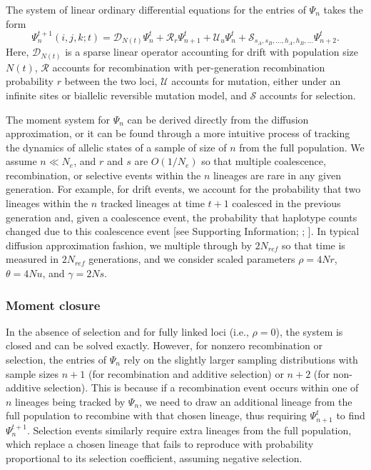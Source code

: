 \documentclass[]{article}
\begin{document}
The system of linear ordinary differential equations for the entries of
\(\Psi_n\) takes the form
\begin{equation}
\label{eq:system}
{\Psi}_n^{t+1}(i, j, k; t) =
\mathcal{D}_{N(t)}\Psi_n^t
+ \mathcal{R}_{r}\Psi_{n+1}^t
+ \mathcal{U}_{u}\Psi_n^t
+ \mathcal{S}_{s_A, s_B, \ldots, h_A, h_B, \ldots}\Psi_{n+2}^t.
\end{equation}
Here, \(\mathcal{D}_{N(t)}\) is a sparse linear operator accounting for drift
with population size \(N(t)\), \(\mathcal{R}\) accounts for recombination
with per-generation recombination probability \(r\) between the two loci,
\(\mathcal{U}\) accounts for mutation, either under an infinite sites or
biallelic reversible mutation model, and \(\mathcal{S}\) accounts for
selection.

The moment system for \(\Psi_n\) can be derived directly from the diffusion
approximation, or it can be found through a more intuitive process of tracking
the dynamics of allelic states of a sample of size of \(n\) from the full
population. We assume \(n \ll N_e\), and \(r\) and \(s\) are \(O(1/N_e)\) so that
multiple coalescence, recombination, or selective events within the \(n\)
lineages are rare in any given generation. For example, for drift events, we
account for the probability that two lineages within the \(n\) tracked lineages
at time \(t+1\) coalesced in the previous generation and, given a coalescence
event, the probability that haplotype counts changed due to this coalescence
event {[}see Supporting Information; \citet{Jouganous2017-pq}; \citet{Ragsdale2019-nt}{]}. In
typical diffusion approximation fashion, we multiple through by \(2N_{ref}\) so
that time is measured in \(2N_{ref}\) generations, and we consider scaled
parameters \(\rho = 4Nr\), \(\theta = 4Nu\), and \(\gamma=2Ns\).

\subsubsection{Moment closure}\label{moment-closure}

In the absence of selection and for fully linked loci (i.e., \(\rho=0\)), the
system is closed and can be solved exactly. However, for nonzero recombination
or selection, the entries of \(\Psi_n\) rely on the slightly larger sampling
distributions with sample sizes \(n+1\) (for recombination and additive
selection) or \(n+2\) (for non-additive selection). This is because if a
recombination event occurs within one of \(n\) lineages being tracked by
\(\Psi_n\), we need to draw an additional lineage from the full population to
recombine with that chosen lineage, thus requiring \(\Psi_{n+1}^t\) to find
\(\Psi_n^{t+1}\). Selection events similarly require extra lineages from the full
population, which replace a chosen lineage that fails to reproduce with
probability proportional to its selection coefficient, assuming negative
selection.
\end{document}
